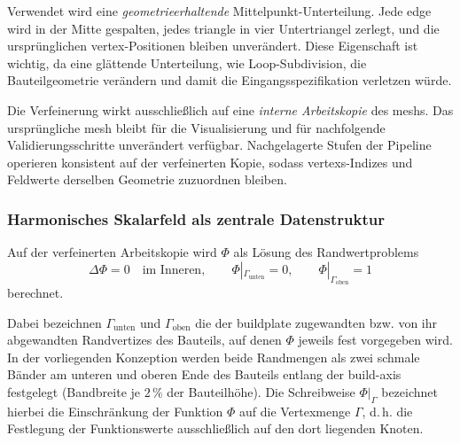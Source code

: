                 Verwendet wird eine \emph{geometrieerhaltende} Mittelpunkt-Unterteilung.
                Jede \gls{edge} wird in der Mitte gespalten, jedes \gls{triangle} in vier Untertriangel zerlegt, und die ursprünglichen \gls{vertex}-Positionen bleiben unverändert.
                Diese Eigenschaft ist wichtig, da eine glättende Unterteilung, wie Loop-Subdivision, die Bauteilgeometrie verändern und damit die Eingangsspezifikation verletzen würde.

                Die Verfeinerung wirkt ausschließlich auf eine \emph{interne Arbeitskopie} des \glspl{mesh}.
                Das ursprüngliche \gls{mesh} bleibt für die Visualisierung und für nachfolgende Validierungsschritte unverändert verfügbar.
                Nachgelagerte Stufen der Pipeline operieren konsistent auf der verfeinerten Kopie, sodass \glspl{vertex}-Indizes und Feldwerte derselben Geometrie zuzuordnen bleiben.

            \subsubsection{Harmonisches Skalarfeld als zentrale Datenstruktur}\label{subsubsec:concept-crystal-harmonic-field} 
                Auf der verfeinerten Arbeitskopie wird $\Phi$ als Lösung des Randwertproblems
                \begin{equation}
                    \Delta \Phi = 0 \quad \text{im Inneren},
                    \qquad
                    \Phi|_{\Gamma_\text{unten}} = 0,
                    \qquad
                    \Phi|_{\Gamma_\text{oben}} = 1
                    \label{eq:concept-crystal-laplace}
                \end{equation}
                berechnet.

                Dabei bezeichnen $\Gamma_\text{unten}$ und $\Gamma_\text{oben}$ die der \gls{buildplate} zugewandten bzw. von ihr abgewandten Randvertizes des Bauteils, auf denen $\Phi$ jeweils fest vorgegeben wird.
                In der vorliegenden Konzeption werden beide Randmengen als zwei schmale Bänder am unteren und oberen Ende des Bauteils entlang der \gls{build-axis} festgelegt (Bandbreite je $2\,\%$ der Bauteilhöhe).
                Die Schreibweise $\Phi|_{\Gamma}$ bezeichnet hierbei die Einschränkung der Funktion $\Phi$ auf die Vertexmenge $\Gamma$, d.\,h. die Festlegung der Funktionswerte ausschließlich auf den dort liegenden Knoten.

